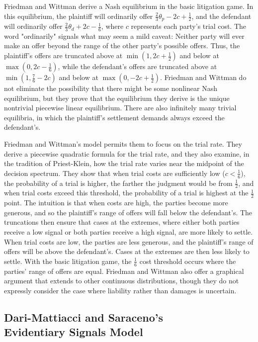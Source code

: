 \documentclass{article}
\begin{document}
Friedman and Wittman derive a Nash equilibrium in the basic litigation game. In this equilibrium, the plaintiff will ordinarily offer $\frac{2}{3}\theta_p -2c + \frac{1}{2}$, and the defendant will ordinarily offer $\frac{2}{3}\theta_d + 2c - \frac{1}{6}$, where $c$ represents each party's trial cost.  The word "ordinarily" signals what may seem a mild caveat: Neither party will ever make an offer beyond the range of the other party's possible offers. Thus, the plaintiff's offers are truncated above at $\min(1, 2c + \frac{1}{2})$ and below at $\max(0, 2c - \frac{1}{6})$, while the defendant's offers are truncated above at $\min(1, \frac{7}{6} - 2c)$ and below at $\max(0, -2c + \frac{1}{2})$. Friedman and Wittman do not eliminate the possibility that there might be some nonlinear Nash equilibrium, but they prove that the equilibrium they derive is the unique nontrivial piecewise linear equilibrium. There are also infinitely many trivial equilibria, in which the plaintiff's settlement demands always exceed the defendant's. 

Friedman and Wittman's model permits them to focus on the trial rate. They derive a piecewise quadratic formula for the trial rate, and they also examine, in the tradition of Priest-Klein, how the trial rate varies near the midpoint of the decision spectrum. They show that when trial costs are sufficiently low ($c < \frac{1}{6}$), the probability of a trial is higher, the farther the judgment would be from $\frac{1}{2}$, and when trial costs exceed this threshold, the probability of a trial is highest at the $\frac{1}{2}$ point. The intuition is that when costs are high, the parties become more generous, and so the plaintiff's range of offers will fall below the defendant's. The truncations then ensure that cases at the extremes, where either both parties receive a low signal or both parties receive a high signal, are more likely to settle. When trial costs are low, the parties are less generous, and the plaintiff's range of offers will be above the defendant's. Cases at the extremes are then less likely to settle. With the basic litigation game, the $\frac{1}{6}$ cost threshold occurs where the parties' range of offers are equal. Friedman and Wittman also offer a graphical argument that extends to other continuous distributions, though they do not expressly consider the case where liability rather than damages is uncertain.

\subsection{Dari-Mattiacci and Saraceno's \\ Evidentiary Signals Model}
\end{document}
